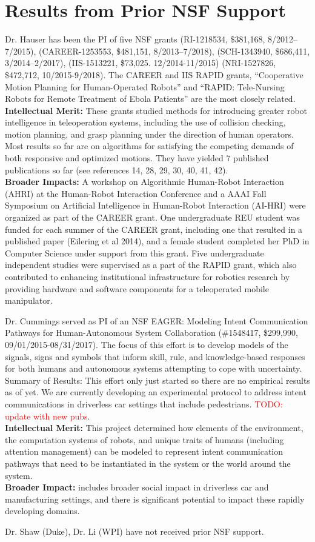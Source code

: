 \section*{Results from Prior NSF Support}

Dr. Hauser has been the PI of five NSF grants (RI-1218534, \$381,168, 8/2012–7/2015), (CAREER-1253553, \$481,151, 8/2013–7/2018), (SCH-1343940, \$686,411, 3/2014–2/2017), (IIS-1513221, \$73,025. 12/2014-11/2015) (NRI-1527826, \$472,712, 10/2015-9/2018). The CAREER and IIS RAPID grants, ``Cooperative Motion Planning for Human-Operated Robots'' and ``RAPID: Tele-Nursing Robots for Remote Treatment of Ebola Patients'' are the most closely related. \\
{\bf Intellectual Merit:} These grants studied methods for introducing greater robot intelligence in teleoperation systems, including the use of collision checking, motion planning, and grasp planning under the direction of human operators. Most results so far are on algorithms for satisfying the competing demands of both responsive and optimized motions. They have yielded 7 published publications so far (see references 14, 28, 29, 30, 40, 41, 42). \\
{\bf Broader Impacts:} A workshop on Algorithmic Human-Robot Interaction (AHRI) at the Human-Robot Interaction Conference and a AAAI Fall Symposium on Artificial Intelligence in Human-Robot Interaction (AI-HRI) were organized as part of the CAREER grant. One undergraduate REU student was funded for each summer of the CAREER grant, including one that resulted in a published paper (Eilering et al 2014), and a female student completed her PhD in Computer Science under support from this grant.  Five undergraduate independent studies were supervised as a part of the RAPID grant, which also contributed to enhancing institutional infrastructure for robotics research by providing hardware and software components for a teleoperated mobile manipulator.


Dr. Cummings served as PI of an NSF EAGER: Modeling Intent Communication Pathways for Human-Autonomous System Collaboration (\#1548417, \$299,990, 09/01/2015-08/31/2017).  The focus of this effort is to develop models of the signals, signs and symbols that inform skill, rule, and knowledge-based responses for both humans and autonomous systems attempting to cope with uncertainty. 
Summary of Results: This effort only just started so there are no empirical results as of yet. We are currently developing an experimental protocol to address intent communications in driverless car settings that include pedestrians. \textcolor{red}{TODO: update with new pubs}.  \\
{\bf Intellectual Merit:} This project determined how elements of the environment, the computation systems of robots, and unique traits of humans (including attention management) can be modeled to represent intent communication pathways that need to be instantiated in the system or the world around the system.\\
{\bf Broader Impact:} includes broader social impact in driverless car and manufacturing settings, and  there is significant potential to impact these rapidly developing domains.

Dr. Shaw (Duke), Dr. Li (WPI) have not received prior NSF support.

